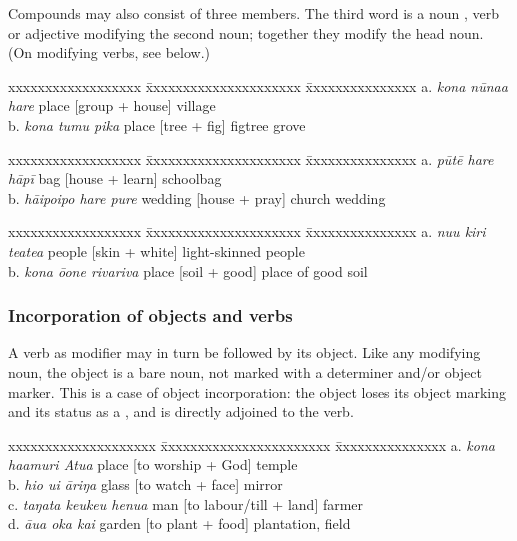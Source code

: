 Compounds may also consist of three members. The third word is a noun , verb  or adjective  modifying the second noun; together they modify the head noun. (On modifying verbs, see  below.)

\ea\label{ex:5.122}
\begin{tabbing}
xxxxxxxxxxxxxxxxxx \= xxxxxxxxxxxxxxxxxxxxx \= xxxxxxxxxxxxxxx \kill
  a. \textit{kona nūna{\ꞌ}a hare}   \> place [group + house]  \> village\\
  b. \textit{kona tumu pika}   \> place [tree + fig]  \> figtree grove
\end{tabbing}
\z

\ea\label{ex:5.123}
\begin{tabbing}
xxxxxxxxxxxxxxxxxx \= xxxxxxxxxxxxxxxxxxxxx \= xxxxxxxxxxxxxxx \kill
  a. \textit{pūtē hare hāpī}   \> bag [house + learn] \>  schoolbag\\
  b. \textit{hāipoipo hare pure}  \>  wedding [house + pray] \>  church wedding
\end{tabbing}
\z

\ea\label{ex:5.124}
\begin{tabbing}
xxxxxxxxxxxxxxxxxx \= xxxxxxxxxxxxxxxxxxxxx \= xxxxxxxxxxxxxxx \kill
  a. \textit{nu{\ꞌ}u kiri teatea} \> people  [skin + white] \>   light-skinned people\\
  b. \textit{kona {\ꞌ}ō{\ꞌ}one rivariva} \>  place [soil + good] \>  place of good soil
\end{tabbing}
\z

\subsubsection[Incorporation of objects and verbs]{Incorporation of objects and verbs}\label{sec:5.7.2.3}
A verb as modifier may in turn be followed by its object. Like any modifying noun, the object is a bare noun, not marked with a determiner and/or object marker. This is a case of object incorporation: the object loses its object marking and its status as a , and is directly adjoined to the verb.

\ea\label{ex:5.125}
\begin{tabbing}
xxxxxxxxxxxxxxxxxxxx \= xxxxxxxxxxxxxxxxxxxxxxx \= xxxxxxxxxxxxxxx \kill
  a. \textit{kona ha{\ꞌ}amuri {\ꞌ}Atua} \> place [to worship + God]  \> temple\\
  b. \textit{hi{\ꞌ}o u{\ꞌ}i {\ꞌ}āriŋa} \> glass [to watch + face]  \> mirror\\
  c. \textit{taŋata keukeu henua} \> man [to labour/till + land]  \> farmer\\
  d. \textit{{\ꞌ}āua {\ꞌ}oka kai} \> garden [to plant + food]  \> plantation, field
\end{tabbing}
\z

